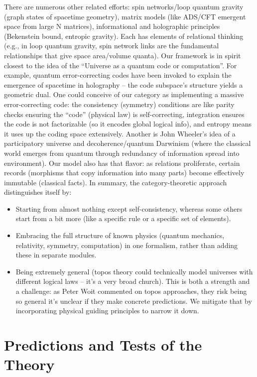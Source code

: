 \documentclass{article}
\begin{document}
There are numerous other related efforts: spin networks/loop quantum gravity (graph states of spacetime geometry), matrix models (like ADS/CFT emergent space from large N matrices), informational and holographic principles (Bekenstein bound, entropic gravity). Each has elements of relational thinking (e.g., in loop quantum gravity, spin network links are the fundamental relationships that give space area/volume quanta). Our framework is in spirit closest to the idea of the “Universe as a quantum code or computation”. For example, quantum error-correcting codes have been invoked to explain the emergence of spacetime in holography – the code subspace’s structure yields a geometric dual. One could conceive of our category as implementing a massive error-correcting code: the consistency (symmetry) conditions are like parity checks ensuring the “code” (physical law) is self-correcting, integration ensures the code is not factorizable (so it encodes global logical info), and entropy means it uses up the coding space extensively. Another is John Wheeler’s idea of a participatory universe and decoherence/quantum Darwinism (where the classical world emerges from quantum through redundancy of information spread into environment). Our model also has that flavor: as relations proliferate, certain records (morphisms that copy information into many parts) become effectively immutable (classical facts). In summary, the category-theoretic approach distinguishes itself by:

\begin{itemize}
\item Starting from almost nothing except self-consistency, whereas some others start from a bit more (like a specific rule or a specific set of elements).
\item Embracing the full structure of known physics (quantum mechanics, relativity, symmetry, computation) in one formalism, rather than adding these in separate modules.
\item Being extremely general (topos theory could technically model universes with different logical laws – it’s a very broad church). This is both a strength and a challenge: as Peter Woit commented on topos approaches, they risk being so general it’s unclear if they make concrete predictions\cite{woit2008}. We mitigate that by incorporating physical guiding principles to narrow it down.
\end{itemize}

\section{Predictions and Tests of the Theory}
\end{document}
